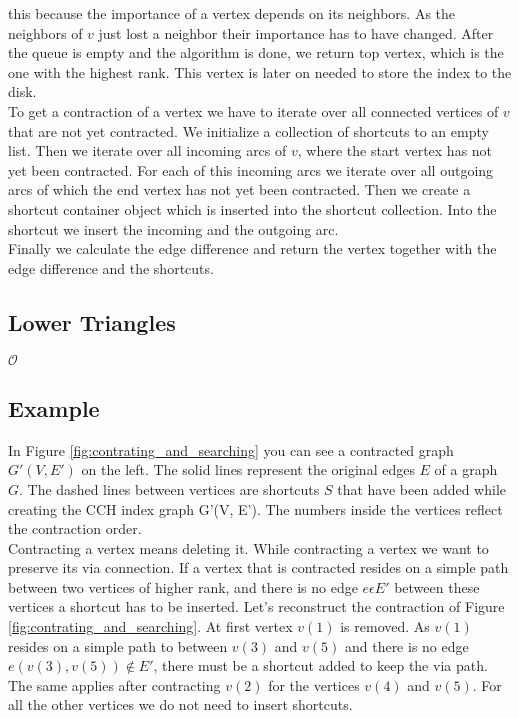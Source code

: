 this because the importance of a vertex depends on its neighbors. As the neighbors of $v$ just lost a neighbor their importance has to have changed.
After the queue is empty and the algorithm is done, we return top vertex, which is the one with the highest rank. This vertex is later on needed to store the index to the disk.
\\
To get a contraction of a vertex we have to iterate over all connected vertices of $v$ that are not yet contracted. We initialize  a collection of shortcuts to an empty list. Then we iterate over all incoming arcs of $v$, where the start vertex has not 
yet been contracted. For each of this incoming arcs we iterate over all outgoing arcs of which the end vertex has not yet been contracted. Then we create a shortcut container object which is inserted into the shortcut collection. Into the shortcut
we insert the incoming and the outgoing arc.
\\
Finally we calculate the edge difference and return the vertex together with the edge difference and the shortcuts.

\subsection{Lower Triangles}
$\mathcal{O}$

\subsection{Example}

In Figure \ref{fig:contrating_and_searching} you can see a contracted graph $G'(V,E')$ on the left. The solid lines represent the original edges $E$ of a graph $G$. The dashed lines between vertices are shortcuts $S$ that 
have been added while creating the CCH index graph G'(V, E'). The numbers inside the vertices reflect the contraction order.
\\
Contracting a vertex means deleting it. While contracting a vertex we want to preserve its via connection. If a vertex that is contracted resides on a simple path between two vertices of higher rank,
and there is no edge $e \epsilon E'$ between these vertices a shortcut has to be inserted. 
Let's reconstruct the contraction of Figure \ref{fig:contrating_and_searching}. At first vertex $v(1)$ is removed. As $v(1)$ resides on a simple path to between $v(3)$ and $v(5)$ and there is no edge $e(v(3), v(5)) \notin E'$,
there must be a shortcut added to keep the via path.
The same applies after contracting $v(2)$ for the vertices $v(4)$ and $v(5)$. For all the other vertices we do not need to insert shortcuts.

